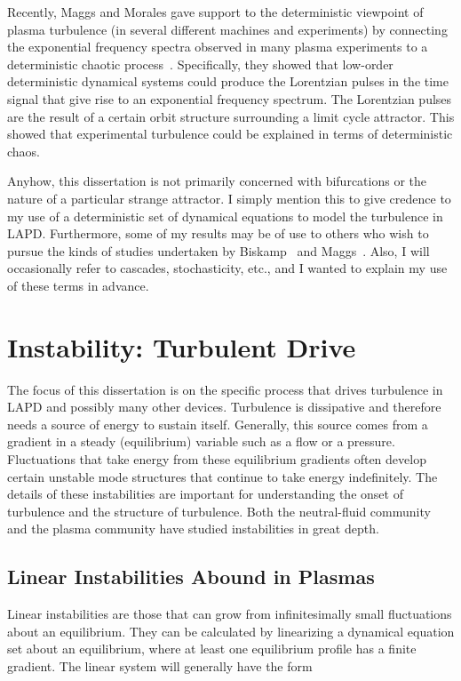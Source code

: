 Recently, Maggs and Morales gave support to the deterministic viewpoint of plasma turbulence (in several different machines and experiments) by connecting the exponential frequency spectra
observed in many plasma experiments to a deterministic chaotic process~\cite{maggs2011,maggs2012a,maggs2012b}. Specifically, they showed that low-order deterministic dynamical systems could
produce the Lorentzian pulses in the time signal that give rise to an exponential frequency spectrum. The Lorentzian pulses are the result of a certain orbit structure surrounding
a limit cycle attractor. This showed that experimental turbulence could be explained in terms of deterministic chaos.

Anyhow, this dissertation is not primarily concerned with bifurcations or the nature of a particular strange attractor. I simply mention this to give credence to my use of a deterministic set
of dynamical equations to model the turbulence in LAPD. Furthermore, some of my results may be of use to others who wish to pursue the kinds of studies undertaken by Biskamp~\cite{biskamp1985}
and Maggs~\cite{maggs2012a}. Also, I will occasionally refer to cascades, stochasticity, etc., and I wanted to explain my use of these terms in advance.


\section{Instability: Turbulent Drive}
\label{s_nlin_stability}

The focus of this dissertation is on the specific process that drives turbulence in LAPD and possibly many other devices. Turbulence is dissipative and therefore needs a source of energy
to sustain itself. Generally, this source comes from a gradient in a steady (equilibrium) variable such as a flow or a pressure. Fluctuations that take energy from these equilibrium
gradients often develop certain unstable mode structures that continue to take energy indefinitely. The details of these instabilities are important for understanding the onset of turbulence
and the structure of turbulence. Both the neutral-fluid community and the plasma community have studied instabilities in great depth.

\subsection{Linear Instabilities Abound in Plasmas}
\label{s_lin_inst_plasmas}

Linear instabilities are those that can grow from infinitesimally small fluctuations about an equilibrium. They can be calculated by linearizing a dynamical equation set about an equilibrium, where
at least one equilibrium profile has a finite gradient. The linear system will generally have the form

